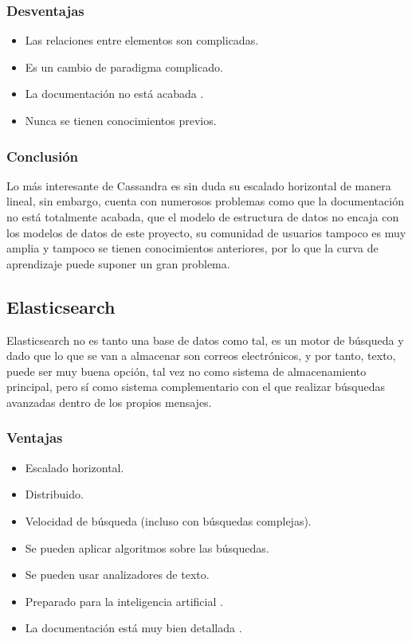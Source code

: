 \subsubsection{Desventajas}
\begin{itemize}
    \item Las relaciones entre elementos son complicadas.
    \item Es un cambio de paradigma complicado.
    \item La documentación no está acabada \cite{Apache_Cassandra_docu}.
    \item Nunca se tienen conocimientos previos.
\end{itemize}
\subsubsection{Conclusión}
Lo más interesante de Cassandra es sin duda su escalado horizontal de manera lineal, sin embargo, cuenta con numerosos problemas como que la documentación no está totalmente acabada, que el modelo de estructura de datos no encaja con los modelos de datos de este proyecto, su comunidad de usuarios tampoco es muy amplia y tampoco se tienen conocimientos anteriores, por lo que la curva de aprendizaje puede suponer un gran problema. 

\subsection{Elasticsearch}
Elasticsearch\cite{Elasticsearch} no es tanto una base de datos como tal, es un motor de búsqueda y dado que lo que se van a almacenar son correos electrónicos, y por tanto, texto, puede ser muy buena opción, tal vez no como sistema de almacenamiento principal, pero sí como sistema complementario con el que realizar búsquedas avanzadas dentro de los propios mensajes. 

\subsubsection{Ventajas}
\begin{itemize}
    \item Escalado horizontal.
    \item Distribuido.
    \item Velocidad de búsqueda (incluso con búsquedas complejas).
    \item Se pueden aplicar algoritmos sobre las búsquedas.
    \item Se pueden usar analizadores de texto.
    \item Preparado para la inteligencia artificial \cite{Elasticsearch_IA}.
    \item La documentación está muy bien detallada \cite{Elasticsearch_docu}.
\end{itemize}
